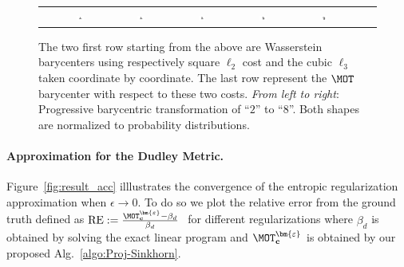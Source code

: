 \begin{figure}[h]
\begin{tabular}{@{}c@{}c@{}c@{}c@{}c@{}c@{}c@{}c@{}}
\\[-.15cm]
&
\includegraphics[width=0.14\textwidth]{figures/bary_GOT_0_28.png}&
\includegraphics[width=0.14\textwidth]{figures/bary_GOT_1_28.png}&
\includegraphics[width=0.14\textwidth]{figures/bary_GOT_2_28.png}&
\includegraphics[width=0.14\textwidth]{figures/bary_GOT_3_28.png}&
\includegraphics[width=0.14\textwidth]{figures/bary_GOT_4_28.png}&

\end{tabular}
\caption{The two first row starting from the above are Wasserstein barycenters using respectively square $\ell_2$ cost  and the cubic $\ell_3$ taken coordinate by coordinate. The last row represent the $\MOT$ barycenter with respect to these two costs. \textit{From left to right}:  Progressive barycentric transformation of ``$2$'' to ``$8$''. Both shapes are normalized to probability distributions.  \label{fig:bary28}}
\end{figure}



\paragraph{Approximation for the Dudley Metric.} Figure~\ref{fig:result_acc} illlustrates the convergence of the entropic regularization approximation when $\epsilon\to 0$. To do so  we plot the relative error from the ground truth defined as $\text{RE}:= \frac{ \MOT_{\mathbf{c}}^{\bm{\varepsilon}}-\beta_d}{\beta_d}\ $ for different regularizations where $\beta_d$ is obtained by solving the exact linear program and $\MOT_{\mathbf{c}}^{\bm{\varepsilon}}$ is obtained by our proposed Alg.~\ref{algo:Proj-Sinkhorn}.

